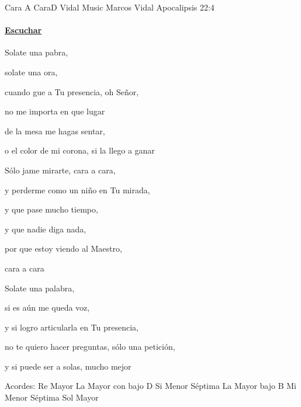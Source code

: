 \documentclass[12pt, spanish]{book}
\newcommand{\NotCCLIed}{\relax}
\begin{document}
    \begin{song}{Cara A Cara}{D}
    {Vidal Music} %
    {Marcos Vidal}
    {Apocalipsis 22:4} %
    {} %
        \ifChordBk
        \paragraph{\mbox{}\hfill\protect\href{https://open.spotify.com/intl-es/track/3AbYh5nP4NdvWUahFCU1Ys}{Escuchar}\mbox{}\hfill}
        \fi

        \begin{SBOpGroup}
            Solate una pabra,

            solate una ora,

            cuando gue a Tu presencia, oh Señor,

            no me importa en que lugar

            de la mesa me hagas sentar,

            o el color de mi corona, si la llego a ganar
        \end{SBOpGroup}

        \begin{SBChorus}
            Sólo jame mirarte, cara a cara,

            y perderme como un niño en Tu mirada,

            y que pase mucho tiempo,

            y que nadie diga nada,

            por que estoy viendo al Maestro,

            cara a cara
        \end{SBChorus}

        \begin{SBOpGroup}
            Solate una palabra,

            si es  aún me queda voz,

            y si logro articularla en Tu presencia,

            no te quiero hacer preguntas, sólo una petición,

            y si puede ser a solas, mucho mejor
        \end{SBOpGroup}

        \ifChordBk
        \begin{SBOpGroup}
            Acordes:
            \upchord{\D}\qquad Re Mayor \hfill
            \upchord{\AD}\qquad La Mayor con bajo D \hfill\null\break
            \upchord{\Bmseven}\qquad\qquad Si Menor S\'eptima \hfill\null\break
            \upchord{\AB}La Mayor bajo B \hfill\null\break
            \upchord{\Emseven}\qquad Mi Menor S\'eptima \hfill
            \upchord{\G}\qquad Sol Mayor \hfill\null\break
        \end{SBOpGroup}
        \fi
    \end{song}
\end{document}
